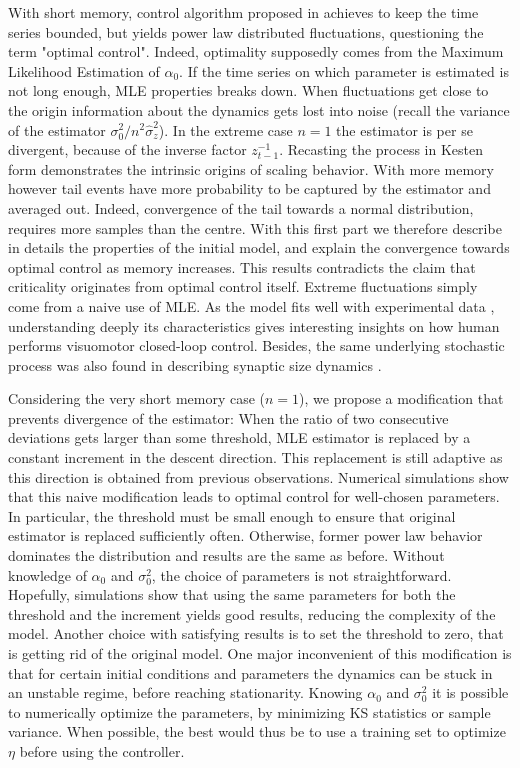 \documentclass[FinalReport.tex]{subfiles}
\begin{document}
With short memory, control algorithm proposed in \cite{OptCont} achieves to keep the time series bounded, but yields power law distributed fluctuations, questioning the term "optimal control". Indeed, optimality supposedly comes from the Maximum Likelihood Estimation of $\alpha_0$. If the time series on which parameter is estimated is not long enough, MLE properties breaks down. When fluctuations get close to the origin information about the dynamics gets lost into noise (recall the variance of the estimator $\sigma_0^2/n^2 \hat{\sigma}_z^2$). In the extreme case $n=1$ the estimator is per se divergent, because of the inverse factor $z_{t-1}^{-1}$. 
Recasting the process in Kesten form demonstrates the intrinsic origins of scaling behavior.
With more memory however tail events have more probability to be captured by the estimator and averaged out. Indeed, convergence of the tail towards a normal distribution, requires more samples than the centre. With this first part we therefore describe in details the properties of the initial model, and explain the convergence towards optimal control as memory increases. This results contradicts the claim that criticality originates from optimal control itself. Extreme fluctuations simply come from a naive use of MLE. As the model fits well with experimental data \cite{FrontNanoScience}, understanding deeply its characteristics gives interesting insights on how human performs visuomotor closed-loop control. Besides, the same underlying stochastic process was also found in describing synaptic size dynamics \cite{Holler2021}. 

Considering the very short memory case ($n=1$), we propose a modification that prevents divergence of the estimator: When the ratio of two consecutive deviations gets larger than some threshold, MLE estimator is replaced by a constant increment in the descent direction. This replacement is still adaptive as this direction is obtained from previous observations. Numerical simulations show that this naive modification leads to optimal control for well-chosen parameters. In particular, the threshold must be small enough to ensure that original estimator is replaced sufficiently often. Otherwise, former power law behavior dominates the distribution and results are the same as before. Without knowledge of $\alpha_0$ and $\sigma_0^2$, the choice of parameters is not straightforward. Hopefully, simulations show that using the same parameters for both the threshold and the increment yields good results, reducing the complexity of the model. Another choice with satisfying results is to set the threshold to zero, that is getting rid of the original model. One major inconvenient of this modification is that for certain initial conditions and parameters the dynamics can be stuck in an unstable regime, before reaching stationarity. Knowing $\alpha_0$ and $\sigma_0^2$ it is possible to numerically optimize the parameters, by minimizing KS statistics or sample variance. When possible, the best would thus be to use a training set to optimize $\eta$ before using the controller. 
\end{document}
